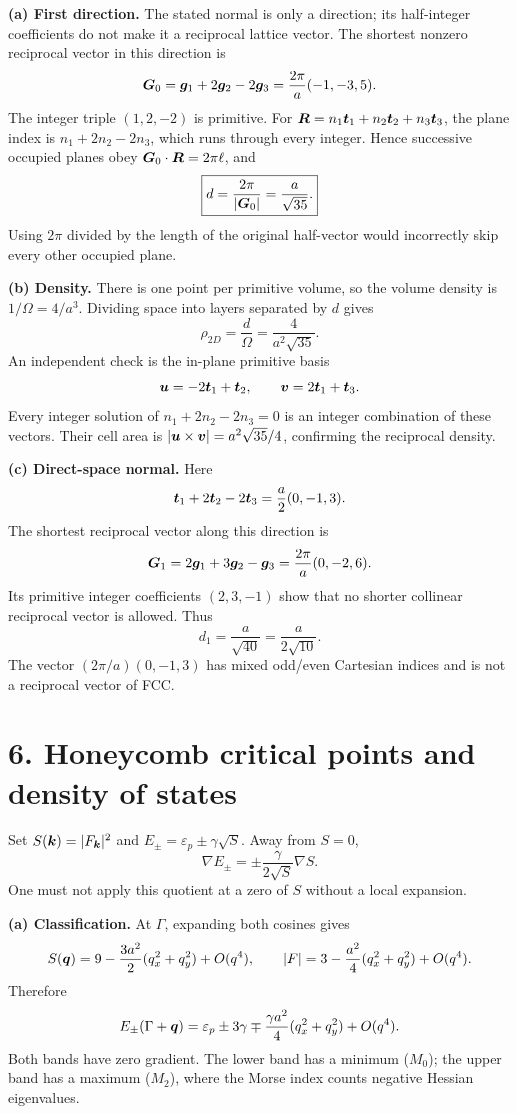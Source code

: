 \textbf{(a) First direction.} The stated normal is only a direction; its half-integer coefficients do not make it a reciprocal lattice vector. The shortest nonzero reciprocal vector in this direction is
\[
\boldsymbol{G}_0=\boldsymbol{g}_1+2\boldsymbol{g}_2-2\boldsymbol{g}_3
=\frac{2\pi}{a}(-1,-3,5).
\]
The integer triple $(1,2,-2)$ is primitive. For $\boldsymbol{R}=n_1\boldsymbol{t}_1+n_2\boldsymbol{t}_2+n_3\boldsymbol{t}_3$, the plane index is $n_1+2n_2-2n_3$, which runs through every integer. Hence successive occupied planes obey $\boldsymbol{G}_0\cdot\boldsymbol{R}=2\pi\ell$, and
\[
\boxed{d=\frac{2\pi}{|\boldsymbol{G}_0|}=\frac a{\sqrt{35}}.}
\]
Using $2\pi$ divided by the length of the original half-vector would incorrectly skip every other occupied plane.

\textbf{(b) Density.} There is one point per primitive volume, so the volume density is $1/\Omega=4/a^3$. Dividing space into layers separated by $d$ gives
\[
\boxed{\rho_{2D}=\frac d\Omega=\frac4{a^2\sqrt{35}}.}
\]
An independent check is the in-plane primitive basis
\[
\boldsymbol{u}=-2\boldsymbol{t}_1+\boldsymbol{t}_2,\qquad
\boldsymbol{v}=2\boldsymbol{t}_1+\boldsymbol{t}_3.
\]
Every integer solution of $n_1+2n_2-2n_3=0$ is an integer combination of these vectors. Their cell area is $|\boldsymbol{u}\times\boldsymbol{v}|=a^2\sqrt{35}/4$, confirming the reciprocal density.

\textbf{(c) Direct-space normal.} Here
\[
\boldsymbol{t}_1+2\boldsymbol{t}_2-2\boldsymbol{t}_3=\frac a2(0,-1,3).
\]
The shortest reciprocal vector along this direction is
\[
\boldsymbol{G}_1=2\boldsymbol{g}_1+3\boldsymbol{g}_2-\boldsymbol{g}_3
=\frac{2\pi}{a}(0,-2,6).
\]
Its primitive integer coefficients $(2,3,-1)$ show that no shorter collinear reciprocal vector is allowed. Thus
\[
\boxed{d_1=\frac a{\sqrt{40}}=\frac a{2\sqrt{10}}.}
\]
The vector $(2\pi/a)(0,-1,3)$ has mixed odd/even Cartesian indices and is not a reciprocal vector of FCC.

\section*{6. Honeycomb critical points and density of states}
Set $S(\boldsymbol{k})=|F_{\boldsymbol{k}}|^2$ and $E_\pm=\varepsilon_p\pm\gamma\sqrt S$. Away from $S=0$,
\[
\nabla E_\pm=\pm\frac{\gamma}{2\sqrt S}\nabla S.
\]
One must not apply this quotient at a zero of $S$ without a local expansion.

\textbf{(a) Classification.} At $\Gamma$, expanding both cosines gives
\[
S(\boldsymbol{q})=9-\frac{3a^2}{2}(q_x^2+q_y^2)+O(q^4),\qquad
|F|=3-\frac{a^2}{4}(q_x^2+q_y^2)+O(q^4).
\]
Therefore
\[
E_\pm(\Gamma+\boldsymbol{q})=\varepsilon_p\pm3\gamma
\mp\frac{\gamma a^2}{4}(q_x^2+q_y^2)+O(q^4).
\]
Both bands have zero gradient. The lower band has a minimum ($M_0$); the upper band has a maximum ($M_2$), where the Morse index counts negative Hessian eigenvalues.

